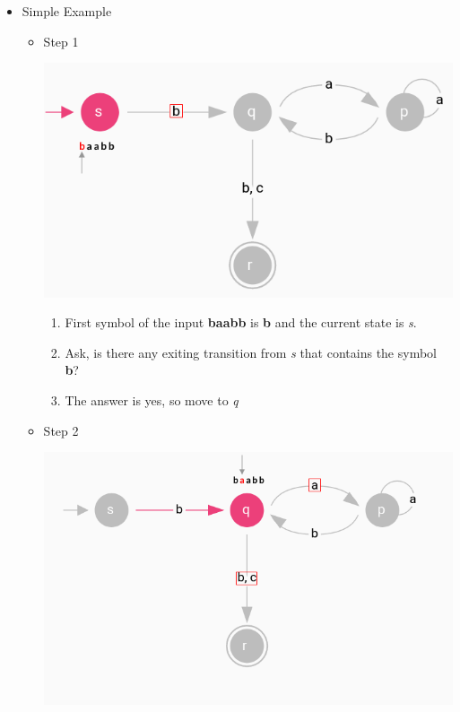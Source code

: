 \documentclass[12pt]{article}
\begin{document}
\begin{itemize}
    \item Simple Example

    \begin{itemize}
        \item Step 1

        \begin{center}
        \includegraphics[width=\linewidth]{images/worksheet_8_notes_9.png}
        \end{center}

        \begin{enumerate}[1.]
            \item First symbol of the input \textbf{baabb} is \textbf{b} and the current state is \textit{s}.
            \item Ask, is there any exiting transition from \textit{s} that contains the symbol \textbf{b}?
            \item The answer is yes, so move to \textit{q}
        \end{enumerate}

        \item Step 2

        \begin{center}
        \includegraphics[width=\linewidth]{images/worksheet_8_notes_10.png}
        \end{center}


\end{itemize}
\end{itemize}
\end{document}
